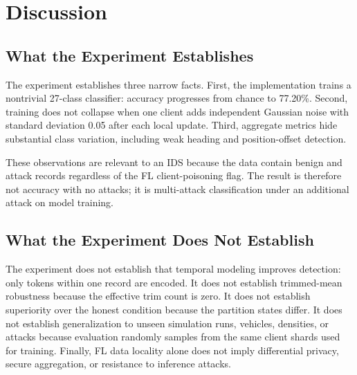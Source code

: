 \documentclass[journal]{IEEEtran}
\begin{document}
\section{Discussion}

\subsection{What the Experiment Establishes}
The experiment establishes three narrow facts. First, the implementation trains a nontrivial 27-class classifier: accuracy progresses from chance to 77.20\%. Second, training does not collapse when one client adds independent Gaussian noise with standard deviation 0.05 after each local update. Third, aggregate metrics hide substantial class variation, including weak heading and position-offset detection.

These observations are relevant to an IDS because the data contain benign and attack records regardless of the FL client-poisoning flag. The result is therefore not accuracy with no attacks; it is multi-attack classification under an additional attack on model training.

\subsection{What the Experiment Does Not Establish}
The experiment does not establish that temporal modeling improves detection: only tokens within one record are encoded. It does not establish trimmed-mean robustness because the effective trim count is zero. It does not establish superiority over the honest condition because the partition states differ. It does not establish generalization to unseen simulation runs, vehicles, densities, or attacks because evaluation randomly samples from the same client shards used for training. Finally, FL data locality alone does not imply differential privacy, secure aggregation, or resistance to inference attacks.
\end{document}
